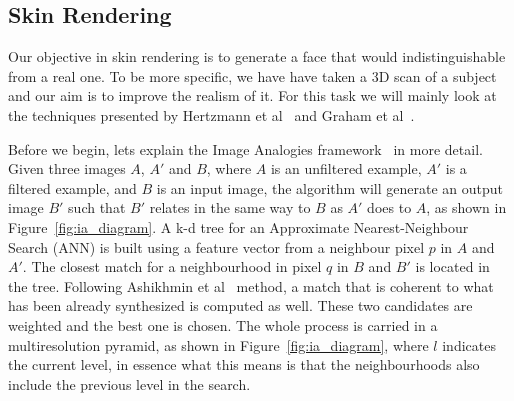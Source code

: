 \documentclass[11pt]{article}
\begin{document}
\subsection{Skin Rendering}

Our objective in skin rendering is to generate a face that would indistinguishable from a real one.
To be more specific, we have have taken a 3D scan of a subject and our aim is to improve the realism of it.
For this task we will mainly look at the techniques presented by Hertzmann et al~\cite{Hertzmann2001} and Graham et al~\cite{Graham2013}.

Before we begin, lets explain the Image Analogies framework~\cite{Hertzmann2001} in more detail.
Given three images $A$, $A'$ and $B$, where $A$ is an unfiltered example, $A'$ is a filtered example, and $B$ is an input image, the algorithm will generate an output image $B'$ such that $B'$ relates in the same way to $B$ as $A'$ does to $A$, as shown in Figure~\ref{fig:ia_diagram}.
A k-d tree for an Approximate Nearest-Neighbour Search (ANN) is built using a feature vector from a neighbour pixel $p$ in $A$ and $A'$.
The closest match for a neighbourhood in pixel $q$ in $B$ and $B'$ is located in the tree.
Following Ashikhmin et al~\cite{Ashikhmin2001} method, a match that is coherent to what has been already synthesized is computed as well.
These two candidates are weighted and the best one is chosen.
The whole process is carried in a multiresolution pyramid, as shown in Figure~\ref{fig:ia_diagram}, where $l$ indicates the current level, in essence what this means is that the neighbourhoods also include the previous level in the search.
\end{document}
